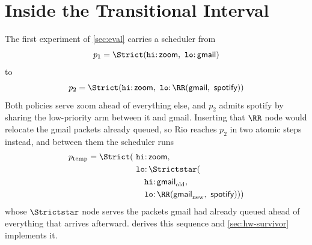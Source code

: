 
\section{Inside the Transitional Interval}\label{app:ptemp}

The first experiment of \cref{sec:eval} carries a scheduler from
%
\[ p_1 = \Strict(\mathtt{hi}{:}\,\textsf{zoom},\ \mathtt{lo}{:}\,\textsf{gmail}) \]
%
to
%
\[ p_2 = \Strict(\mathtt{hi}{:}\,\textsf{zoom},\ \mathtt{lo}{:}\,\RR(\textsf{gmail},\allowbreak\ \textsf{spotify})) \]
%
Both policies serve \textsf{zoom} ahead of everything else, and \(p_2\) admits \textsf{spotify} by sharing the low-priority arm between it and \textsf{gmail}.
Inserting that \(\RR\) node would relocate the \textsf{gmail} packets already queued, so Rio reaches \(p_2\) in two atomic steps instead, and between them the scheduler runs
%
\[
\begin{aligned}
p_\text{temp} = \Strict(\ &\mathtt{hi}{:}\,\textsf{zoom}, \\
 &\mathtt{lo}{:}\,\Strictstar( \\
 &\quad \mathtt{hi}{:}\,\textsf{gmail}_\text{old}, \\
 &\quad \mathtt{lo}{:}\,\RR(\textsf{gmail}_\text{new},\ \textsf{spotify})))
\end{aligned}
\]
%
whose \(\Strictstar\) node serves the packets \textsf{gmail} had already queued ahead of everything that arrives afterward.
 derives this sequence and \cref{sec:hw-survivor} implements it.

